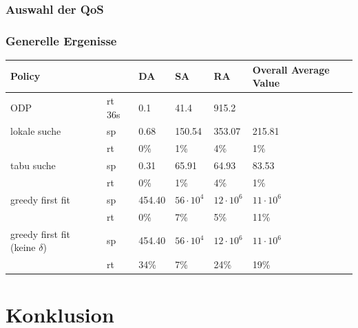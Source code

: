 \documentclass{article}
\begin{document}
\subsubsection{Auswahl der QoS}

\subsubsection{Generelle Ergenisse}
\begin{table}[htbp]
    \centering

    \begin{tabular}{llllll}
    \toprule
    Policy                           &      & DA        & SA       & RA & Overall Average Value \\
    \midrule
    ODP                              &rt 36s&  0.1      & 41.4             & 915.2            &             \\
    \cmidrule{1-5}
    lokale suche                     &sp    &  0.68     & 150.54           & 353.07           & 215.81      \\
                                     &rt    &0\%        & 1\%              &4\%               & 1\%         \\
    tabu suche                       &sp    &  0.31     & 65.91            & 64.93            & 83.53       \\
                                     &rt    &0\%        & 1\%              &4\%               & 1\%         \\           
    greedy first fit                 &sp    &  454.40   & $56 \cdot 10^4$ & $12 \cdot 10^6$ & $11 \cdot 10^6$  \\
                                     &rt    &0\%        & 7\%              &5\%               &11\%               \\
    greedy first fit (keine $\delta$)&sp    &  454.40   & $56 \cdot 10^4$ & $12 \cdot 10^6$ & $11 \cdot 10^6$  \\
                                     &rt    &34\%       & 7\%              &24\%              & 19\%               \\
    \bottomrule
    \end{tabular}
\end{table}


\section{Konklusion}




\newpage

\end{document}
